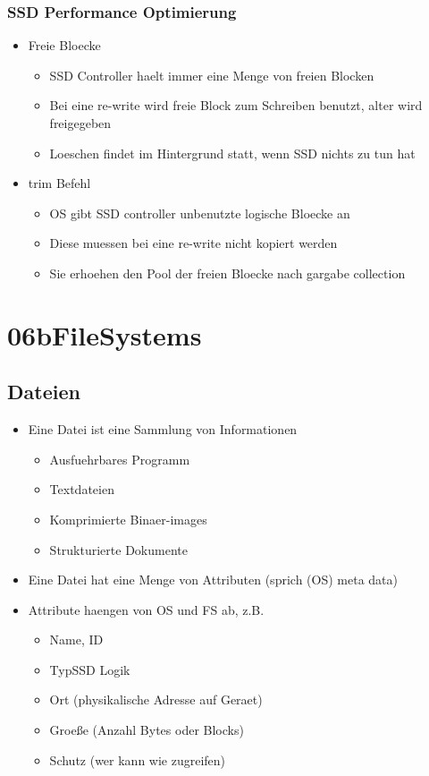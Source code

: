 \documentclass[a4paper]{scrreprt}
\begin{document}
\subsection{SSD Performance Optimierung}
\begin{itemize}
	\item Freie Bloecke
		\begin{itemize}
			\item SSD Controller haelt immer eine Menge von freien Blocken
			\item Bei eine re-write wird freie Block zum Schreiben benutzt, alter wird freigegeben
			\item Loeschen findet im Hintergrund statt, wenn SSD nichts zu tun hat
		\end{itemize}
	\item trim Befehl
		\begin{itemize}
			\item OS gibt SSD controller unbenutzte logische Bloecke an
			\item Diese muessen bei eine re-write nicht kopiert werden
			\item Sie erhoehen den Pool der freien Bloecke nach gargabe collection
		\end{itemize}
\end{itemize}

\chapter{06bFileSystems}

\section{Dateien}
\begin{itemize}
	\item Eine Datei ist eine Sammlung von Informationen
		\begin{itemize}
			\item Ausfuehrbares Programm
			\item Textdateien
			\item Komprimierte Binaer-images
			\item Strukturierte Dokumente
		\end{itemize}
	\item Eine Datei hat eine Menge von Attributen (sprich (OS) meta data)
	\item Attribute haengen von OS und FS ab, z.B.
		\begin{itemize}
			\item Name, ID
			\item TypSSD Logik
			\item Ort (physikalische Adresse auf Geraet)
			\item Groeße (Anzahl Bytes oder Blocks)
			\item Schutz (wer kann wie zugreifen)
		\end{itemize}
\end{itemize}
\end{document}
